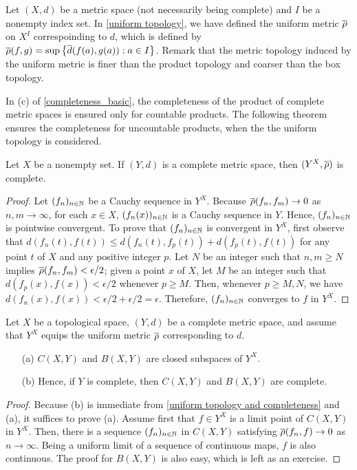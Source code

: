 Let $(X, d)$ be a metric space (not necessarily being complete) and $I$ be a nonempty index set.
In \cref{uniform topology}, we have defined the uniform metric $\overline{\rho}$ on $X^I$ correspoinding to $d$, which is defined by $\overline{\rho}(f, g)=\sup\left\{\overline{d}(f(a), g(a)): a\in I\right\}$.
Remark that the metric topology induced by the uniform metric is finer than the product topology and coarser than the box topology.

In (c) of \cref{completeness_basic}, the completeness of the product of complete metric spaces is ensured only for countable products.
The following theorem ensures the completeness for uncountable products, when the the uniform topology is considered.
\begin{thm}\label{uniform topology and completeness}
    Let $X$ be a nonempty set.
    If $(Y, d)$ is a complete metric space, then $(Y^X, \overline{\rho})$ is complete.
\end{thm}
\begin{proof}
    Let $(f_n)_{n\in{\mathbb{N}}}$ be a Cauchy sequence in $Y^X$.
    Because $\overline{\rho}(f_n, f_m)\rightarrow 0$ as $n, m\rightarrow\infty$, for each $x\in X$, $(f_n(x))_{n\in{\mathbb{N}}}$ is a Cauchy sequence in $Y$.
    Hence, $(f_n)_{n\in{\mathbb{N}}}$ is pointwise convergent.
    To prove that $(f_n)_{n\in{\mathbb{N}}}$ is convergent in $Y^X$, first observe that $d(f_n(t), f(t))\leq d(f_n(t), f_p(t))+d(f_p(t), f(t))$ for any point $t$ of $X$ and any positive integer $p$.
    Let $N$ be an integer such that $n, m\geq N$ implies $\overline{\rho}(f_n, f_m)<\epsilon/2$; given a point $x$ of $X$, let $M$ be an integer such that $d(f_p(x), f(x))<\epsilon/2$ whenever $p\geq M$.
    Then, whenever $p\geq M, N$, we have $d(f_n(x), f(x))<\epsilon/2+\epsilon/2=\epsilon$.
    Therefore, $(f_n)_{n\in{\mathbb{N}}}$ converges to $f$ in $Y^X$.
\end{proof}

\begin{thm}\label{Complete spaces of functions}
    Let $X$ be a topological space, $(Y, d)$ be a complete metric space, and assume that $Y^X$ equips the uniform metric $\overline{\rho}$ corresponding to $d$.
    \begin{enumerate}
        \item[(a)]
        {
            $C(X, Y)$ and $B(X, Y)$ are closed subspaces of $Y^X$.
        }
        \item[(b)]
        {
            Hence, if $Y$ is complete, then $C(X, Y)$ and $B(X, Y)$ are complete.
        }
    \end{enumerate}
\end{thm}
\begin{proof}
    Because (b) is immediate from \cref{uniform topology and completeness} and (a), it suffices to prove (a).
    Assume first that $f\in Y^X$ is a limit point of $C(X, Y)$ in $Y^X$.
    Then, there is a sequence $(f_n)_{n\in{\mathbb{N}}}$ in $C(X, Y)$ satisfying $\overline{\rho}(f_n, f)\rightarrow 0$ as $n\rightarrow\infty$.
    Being a uniform limit of a sequence of continuous maps, $f$ is also continuous.
    \color{brown}The proof for $B(X, Y)$ is also easy, which is left as an exercise. \color{black}
\end{proof}

